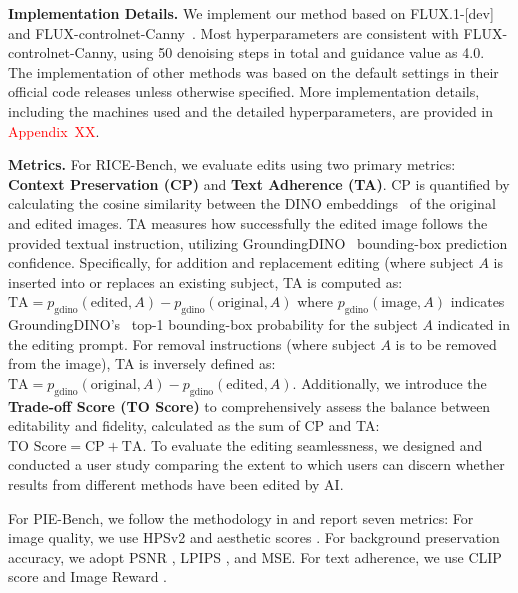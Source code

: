 \documentclass{article}
\begin{document}
\textbf{Implementation Details.} We implement our method based on FLUX.1-[dev]~\cite{blackforest2024FLUX} and FLUX-controlnet-Canny~\cite{xlabsai2025fluxcontrolnet}. Most hyperparameters are consistent with FLUX-controlnet-Canny, using 50 denoising steps in total and guidance value as 4.0. The implementation of other methods was based on the default settings in their official code releases unless otherwise specified. More implementation details, including the machines used and the detailed hyperparameters, are provided in \textcolor{red}{Appendix~XX}.




\textbf{Metrics.} For RICE-Bench, we evaluate edits using two primary metrics: \textbf{Context Preservation (CP)} and \textbf{Text Adherence (TA)}. CP is quantified by calculating the cosine similarity between the DINO embeddings~\citep{caron2021emerging} of the original and edited images. TA measures how successfully the edited image follows the provided textual instruction, utilizing GroundingDINO~\citep{liu2024grounding} bounding-box prediction confidence. Specifically, for {addition} and {replacement} editing (where subject \(A\) is inserted into or replaces an existing subject, TA is computed as: $\text{TA} = p_{\text{gdino}}(\text{edited}, A) - p_{\text{gdino}}(\text{original}, A)$ where \(p_{\text{gdino}}(\text{image}, A)\) indicates GroundingDINO's~\citep{liu2024grounding} top-1 bounding-box probability for the subject \(A\) indicated in the editing prompt. For {removal} instructions (where subject \(A\) is to be removed from the image), TA is inversely defined as: $\text{TA} = p_{\text{gdino}}(\text{original}, A) - p_{\text{gdino}}(\text{edited}, A)$. Additionally, we introduce the \textbf{Trade-off Score (TO Score)} to comprehensively assess the balance between editability and fidelity, calculated as the sum of CP and TA:$\text{TO Score} = \text{CP} + \text{TA}$. To evaluate the editing seamlessness, we designed and conducted a user study comparing the extent to which users can discern whether results from different methods have been edited by AI.



For PIE-Bench, we follow the methodology in \cite{zhu2025kv} and report seven metrics: For image quality, we use HPSv2 \citep{wu2023human} and aesthetic scores \citep{schuhmann2022laionb}. For background preservation accuracy, we adopt PSNR \citep{huynh2008scope}, LPIPS \citep{zhang2018perceptual}, and MSE. For text adherence, we use CLIP score \citep{radford2021learning} and Image Reward \citep{xu2023imagereward}.
\end{document}
